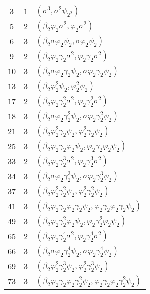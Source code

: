 \tablelasttail{\hline}
\begin{supertabular}{|c|c|p{9cm}|}
$3$
&$1$ &$(\sigma^{3},\sigma^{2}\psi_{2^{2}})$\\
$5$
&$2$ &$(\beta_2\varphi_2\sigma^{2},\varphi_2\sigma^{2})$\\
$6$
&$3$ &$(\beta_2\sigma\varphi_2\psi_2,\sigma\varphi_2\psi_2)$\\
$9$
&$2$ &$(\beta_2\varphi_2\gamma_2\sigma^{2},\varphi_2\gamma_2\sigma^{2})$\\
$10$
&$3$ &$(\beta_2\sigma\varphi_2\gamma_2\psi_2,\sigma\varphi_2\gamma_2\psi_2)$\\
$13$
&$3$ &$(\beta_2\varphi_2^{2}\psi_2,\varphi_2^{2}\psi_2)$\\
$17$
&$2$ &$(\beta_2\varphi_2\gamma_2^{2}\sigma^{2},\varphi_2\gamma_2^{2}\sigma^{2})$\\
$18$
&$3$ &$(\beta_2\sigma\varphi_2\gamma_2^{2}\psi_2,\sigma\varphi_2\gamma_2^{2}\psi_2)$\\
$21$
&$3$ &$(\beta_2\varphi_2^{2}\gamma_2\psi_2,\varphi_2^{2}\gamma_2\psi_2)$\\
$25$
&$3$ &$(\beta_2\varphi_2\gamma_2\varphi_2\psi_2,\varphi_2\gamma_2\varphi_2\psi_2)$\\
$33$
&$2$ &$(\beta_2\varphi_2\gamma_2^{3}\sigma^{2},\varphi_2\gamma_2^{3}\sigma^{2})$\\
$34$
&$3$ &$(\beta_2\sigma\varphi_2\gamma_2^{3}\psi_2,\sigma\varphi_2\gamma_2^{3}\psi_2)$\\
$37$
&$3$ &$(\beta_2\varphi_2^{2}\gamma_2^{2}\psi_2,\varphi_2^{2}\gamma_2^{2}\psi_2)$\\
$41$
&$3$ &$(\beta_2\varphi_2\gamma_2\varphi_2\gamma_2\psi_2,\varphi_2\gamma_2\varphi_2\gamma_2\psi_2)$\\
$49$
&$3$ &$(\beta_2\varphi_2\gamma_2^{2}\varphi_2\psi_2,\varphi_2\gamma_2^{2}\varphi_2\psi_2)$\\
$65$
&$2$ &$(\beta_2\varphi_2\gamma_2^{4}\sigma^{2},\varphi_2\gamma_2^{4}\sigma^{2})$\\
$66$
&$3$ &$(\beta_2\sigma\varphi_2\gamma_2^{4}\psi_2,\sigma\varphi_2\gamma_2^{4}\psi_2)$\\
$69$
&$3$ &$(\beta_2\varphi_2^{2}\gamma_2^{3}\psi_2,\varphi_2^{2}\gamma_2^{3}\psi_2)$\\
$73$
&$3$ &$(\beta_2\varphi_2\gamma_2\varphi_2\gamma_2^{2}\psi_2,\varphi_2\gamma_2\varphi_2\gamma_2^{2}\psi_2)$\\

\end{supertabular}
